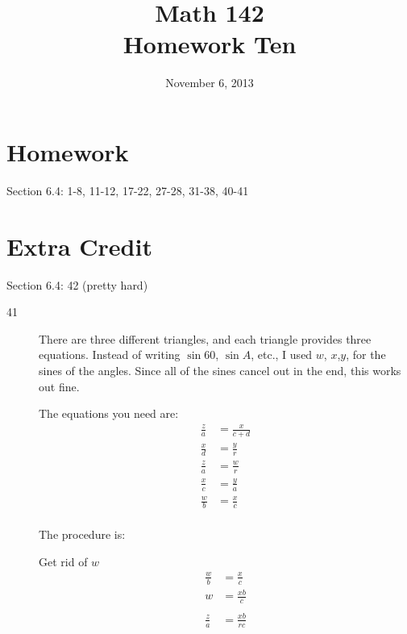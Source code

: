 \documentclass{exam}
\author{}
\date{November 6, 2013}
\title{Math 142 \\ Homework Ten}
\begin{document}
  \maketitle

  \section{Homework}
  Section 6.4: 1-8, 11-12, 17-22, 27-28, 31-38, 40-41

  \section{Extra Credit}
  Section 6.4: 42 (pretty hard)

  \ifprintanswers

  \begin{description}
    \item[41]

      There are three different triangles, and each triangle provides three equations.  Instead of writing $\sin 60$,
      $\sin A$, etc., I used $w$, $x$,$y$, for the sines of the angles.  Since all of the sines cancel out in the end,
      this works out fine.

      The equations you need are:
      \begin{align*}
        \frac{z}{a} &= \frac{x}{c + d} \\
        \frac{x}{d} &= \frac{y}{r} \\
        \frac{z}{a} &= \frac{w}{r} \\
        \frac{x}{c} &= \frac{y}{a} \\
        \frac{w}{b} &= \frac{x}{c} \\
      \end{align*}

      The procedure is:

      Get rid of $w$
      \begin{align*}
        \frac{w}{b} & = \frac{x}{c} \\
        w           & = \frac{xb}{c} \\
        \\
        \frac{z}{a} & = \frac{xb}{rc} \\
      \end{align*}


\end{description}
\end{document}
